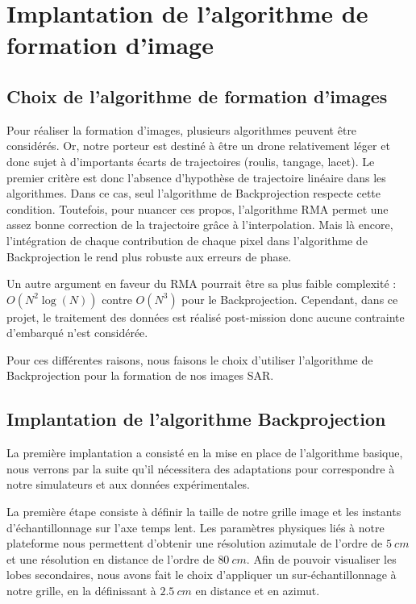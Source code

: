 \section{Implantation de l'algorithme de formation d'image}
\label{sec:proj_backprojection}

\subsection{Choix de l'algorithme de formation d'images}\label{subsec:choix_algo_image}
Pour réaliser la formation d'images, plusieurs algorithmes peuvent être considérés. Or, notre porteur est destiné à être un drone relativement léger et donc sujet à d'importants écarts de trajectoires (roulis, tangage, lacet). Le premier critère est donc l'absence d'hypothèse de trajectoire linéaire dans les algorithmes. Dans ce cas, seul l'algorithme de Backprojection respecte cette condition. Toutefois, pour nuancer ces propos, l'algorithme RMA permet une assez bonne correction de la trajectoire grâce à l'interpolation. Mais là encore, l'intégration de chaque contribution de chaque pixel dans l'algorithme de Backprojection le rend plus robuste aux erreurs de phase. 

Un autre argument en faveur du RMA pourrait être sa plus faible complexité : $O(N^2\log(N))$ contre $O(N^3)$ pour le Backprojection. Cependant, dans ce projet, le traitement des données est réalisé post-mission donc aucune contrainte d'embarqué n'est considérée. 

Pour ces différentes raisons, nous faisons le choix d'utiliser l'algorithme de Backprojection pour la formation de nos images SAR.

\subsection{Implantation de l'algorithme Backprojection}\label{subsec:implem_BP}

La première implantation a consisté en la mise en place de l'algorithme basique, nous verrons par la suite qu'il nécessitera des adaptations pour correspondre à notre simulateurs et aux données expérimentales. 

La première étape consiste à définir la taille de notre grille image et les instants d'échantillonnage sur l'axe temps lent. Les paramètres physiques liés à notre plateforme nous permettent d'obtenir une résolution azimutale de l'ordre de $5~cm$ et une résolution en distance de l'ordre de $80~cm$. Afin de pouvoir visualiser les lobes secondaires, nous avons fait le choix d'appliquer un sur-échantillonnage à notre grille, en la définissant à $2.5~cm$ en distance et en azimut.

